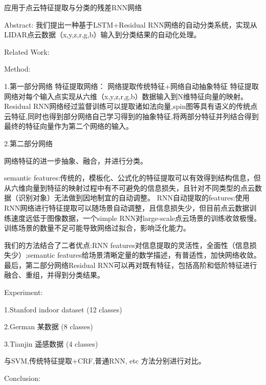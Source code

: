 应用于点云特征提取与分类的残差RNN网络

Abstract:
我们提出一种基于LSTM+Residual RNN网络的自动分类系统，实现从LIDAR点云数据（x,y,z,r,g,b）输入到分类结果的自动化处理。

Related Work:

Method:

1.第一部分网络
特征提取网络：
网络提取传统特征+网络自动抽象特征
特征提取网络对每个输入点实现从六维（x,y,z,r,g,b）数据输入到N维特征向量的映射。Residual RNN网络经过监督训练可以提取诸如法向量,spin图等具有语义的传统点云特征,同时也得到部分网络自己学习得到的抽象特征,将两部分特征并列结合得到最终的特征向量作为第二个网络的输入。

2.第二部分网络

网络特征的进一步抽象、融合，并进行分类。


semantic features:传统的，模板化、公式化的特征提取可以有效得到结构信息，但从六维向量到特征的映射过程中有不可避免的信息损失，且针对不同类型的点云数据（识别对象）无法做到因地制宜的自动调整。
RNN自动提取的features:使用RNN网络进行特征提取可以随场景自动调整，且信息损失少，但目前点云数据训练速度远低于图像数据，一个simple RNN对large-scale点云场景的训练收敛极慢。训练场景的数量不足可能导致网络过拟合，影响泛化能力。

我们的方法结合了二者优点:RNN features对信息提取的灵活性，全面性（信息损失少）;semantic features给场景清晰定量的数学描述，有普适性，加快网络收敛。最后，第二部分网络Residual RNN可以再对既有特征，包括高阶和低阶特征进行融合、重组，并得到分类结果。


Experiment:

1.Stanford indoor dataset (12 classes)

2.German 某数据 (8 classes)

3.Tianjin 遥感数据 (4 classes)

与SVM,传统特征提取+CRF,普通RNN, etc 方法分别进行对比。

Conclusion:
